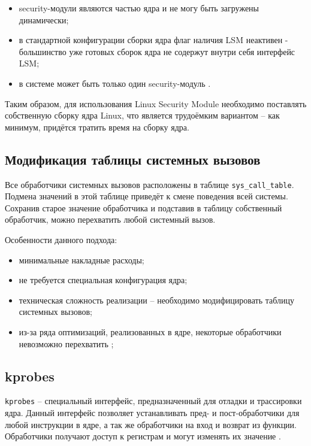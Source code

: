 \begin{itemize}
	\item security-модули являются частью ядра и не могу быть загружены динамически;
	\item в стандартной конфигурации сборки ядра флаг наличия LSM неактивен - большинство уже готовых сборок ядра не содержут внутри себя интерфейс LSM;
	\item в системе может быть только один security-модуль \cite{linux-security-api}.
\end{itemize}

Таким образом, для использования Linux Security Module необходимо поставлять собственную сборку ядра Linux, что является трудоёмким вариантом -- как минимум, придётся тратить время на сборку ядра.

\subsection{Модификация таблицы системных вызовов}

Все обработчики системных вызовов расположены в таблице \texttt{sys\_call\_table}. Подмена значений в этой таблице приведёт к смене поведения всей системы. Сохранив старое значение обработчика и подставив в таблицу собственный обработчик, можно перехватить любой системный вызов.

Особенности данного подхода:

\begin{itemize}
	\item минимальные накладные расходы;
	\item не требуется специальная конфигурация ядра;
	\item техническая сложность реализации -- необходимо модифицировать таблицу системных вызовов;
	\item из-за ряда оптимизаций, реализованных в ядре, некоторые обработчики невозможно перехватить \cite{habr-profiling-linux};
\end{itemize}

\subsection{kprobes}

\texttt{kprobes} \cite{kprobes} -- специальный интерфейс, предназначенный для отладки и трассировки ядра. Данный интерфейс позволяет устанавливать пред- и пост-обработчики для любой инструкции в ядре, а так же обработчики на вход и возврат из функции. Обработчики получают доступ к регистрам и могут изменять их значение \cite{habr-profiling-linux}.

